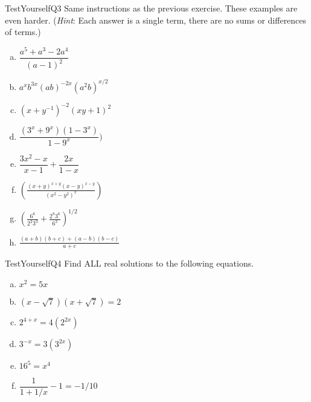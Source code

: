 \begin{exercise}{TestYourselfQ3}
Same instructions as the previous exercise. These examples are even harder. (\emph{Hint}: Each answer is a single term, there are no sums or differences of terms.)
\begin{multicols}{2}
\begin{enumerate}[(a)]
\item
$\dfrac{a^5 +a^3 - 2a^4}{(a-1)^2}$
\item
$a^x b^{3x}(ab)^{-2x}(a^2 b)^{x/2}$
\item
$(x+y^{-1})^{-2}(xy+1)^2$
\item
$\dfrac{(3^x+9^x)(1-3^x)}{1-9^x})$
\item
$\dfrac{3x^2 - x}{x-1} + \dfrac{2x}{1-x}$
\item
$\displaystyle{ \left(\frac{(x+y)^{x+y}(x-y)^{x-y}}{(x^2 - y^2)^x}\right)}$
\item
$ \displaystyle{\left( \frac{6^6}{2^2 3^3} +  \frac{2^8 3^6}{6^3}\right)^{1/2}} $
\item
$ \displaystyle{\frac{(a+b)(b+c) + (a-b)(b-c)}{a+c} }$

\end{enumerate}
\end{multicols}
\end{exercise}

\begin{exercise}{TestYourselfQ4}
Find ALL real solutions to the following equations. 
\begin{multicols}{2}
\begin{enumerate}[(a)]
\item
$x^2 = 5x$
\item
$(x - \sqrt{7})(x+\sqrt{7}) = 2$
\item
$2^{4+x} = 4(2^{2x})$
\item
$3^{-x} = 3(3^{2x})$
\item
$16^5 = x^4$
\item
$\dfrac{1}{1 + 1/x} -1= -1/10$
\end{enumerate}
\end{multicols}
\end{exercise}

